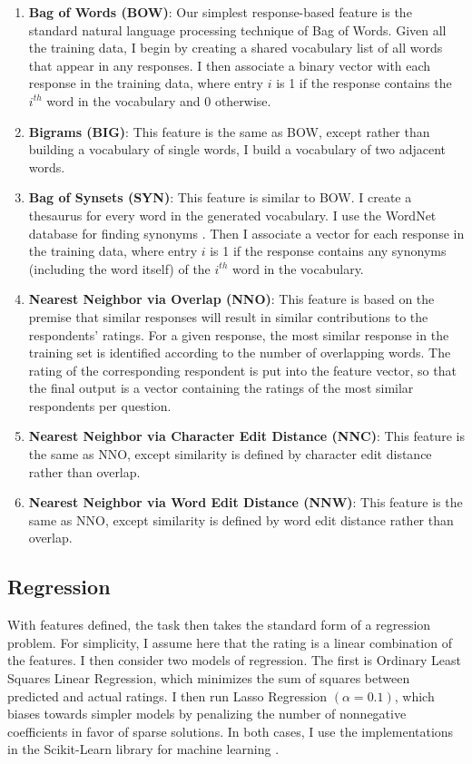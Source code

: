 \begin{enumerate}

\item \textbf{Bag of Words (BOW)}: Our simplest response-based feature is the standard natural language processing technique of Bag of Words. Given all the training data, I begin by creating a shared vocabulary list of all words that appear in any responses. I then associate a binary vector with each response in the training data, where entry $i$ is 1 if the response contains the $i^{th}$ word in the vocabulary and 0 otherwise.

\item \textbf{Bigrams (BIG)}: This feature is the same as BOW, except rather than building a vocabulary of single words, I build a vocabulary of two adjacent words.

\item \textbf{Bag of Synsets (SYN)}: This feature is similar to BOW. I create a thesaurus for every word in the generated vocabulary. I use the WordNet database for finding synonyms \cite{wordnet}. Then I associate a vector for each response in the training data, where entry $i$ is 1 if the response contains any synonyms (including the word itself) of the $i^{th}$ word in the vocabulary.

\item \textbf{Nearest Neighbor via Overlap (NNO)}: This feature is based on the premise that similar responses will result in similar contributions to the respondents' ratings. For a given response, the most similar response in the training set is identified according to the number of overlapping words. The rating of the corresponding respondent is put into the feature vector, so that the final output is a vector containing the ratings of the most similar respondents per question.

\item \textbf{Nearest Neighbor via Character Edit Distance (NNC)}: This feature is the same as NNO, except similarity is defined by character edit distance rather than overlap.

\item \textbf{Nearest Neighbor via Word Edit Distance (NNW)}: This feature is the same as NNO, except similarity is defined by word edit distance rather than overlap.


\end{enumerate}

\subsection{Regression}
With features defined, the task then takes the standard form of a regression problem. For simplicity, I assume here that the rating is a linear combination of the features. I then consider two models of regression. The first is Ordinary Least Squares Linear Regression, which minimizes the sum of squares between predicted and actual ratings. I then run Lasso Regression $(\alpha = 0.1)$, which biases towards simpler models by penalizing the number of nonnegative coefficients in favor of sparse solutions. In both cases, I use the implementations in the Scikit-Learn library for machine learning \cite{pedregosa11}.
